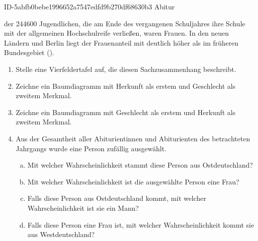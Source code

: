\begin{exercise}
      {ID-5abfb0bebe1996652a7547edfd9b270df68630b3}
      {Abitur}
  \ifproblem\problem\par
     der \num{244600} Jugendlichen, die am Ende des vergangenen
    Schuljahres ihre Schule mit der allgemeinen Hochschulreife verließen,
    waren Frauen. In den neuen Ländern und Berlin liegt der Frauenanteil
    mit  deutlich höher als im früheren Bundesgebiet ().
    \begin{enumerate}
      \item Stelle eine Vierfeldertafel auf, die diesen Sachzusammenhang
            beschreibt.
      \item Zeichne ein Baumdiagramm mit \glqq Herkunft\grqq{} als erstem
            und \glqq{} Geschlecht\grqq{} als zweitem Merkmal.
      \item Zeichne ein Baumdiagramm mit \glqq Geschlecht\grqq{} als erstem
            und \glqq{} Herkunft\grqq{} als zweitem Merkmal.
      \item Aus der Gesamtheit aller Abiturientinnen und Abiturienten des
            betrachteten Jahrgangs wurde eine Person zufällig ausgewählt.
            \begin{enumerate}[a)]
              \item Mit welcher Wahrscheinlichkeit stammt diese Person aus
                    Ostdeutschland?
              \item Mit welcher Wahrscheinlichkeit ist die ausgewählte
                    Person eine Frau?
              \item Falls diese Person aus Ostdeutschland kommt, mit welcher
                    Wahrscheinlichkeit ist sie ein Mann?
              \item Falls diese Person eine Frau ist, mit welcher
                    Wahrscheinlichkeit kommt sie aus Westdeutschland?
            \end{enumerate}
    \end{enumerate}
  \fi
\end{exercise}
